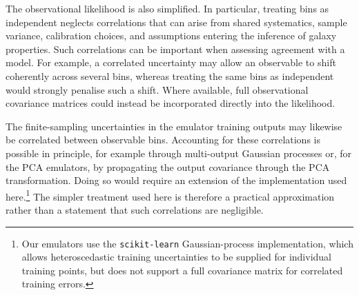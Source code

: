 \documentclass[twocolumn, apj, numberedappendix, iop]{openjournal}
\begin{document}
The observational likelihood is also simplified. In particular, treating bins
as independent neglects correlations that can arise from shared systematics,
sample variance, calibration choices, and assumptions entering the inference
of galaxy properties. Such correlations can be important when assessing
agreement with a model. For example, a correlated uncertainty may allow an
observable to shift coherently across several bins, whereas treating the same
bins as independent would strongly penalise such a shift. Where available, full observational covariance matrices could instead be incorporated directly into the likelihood.

The finite-sampling uncertainties in the emulator training outputs may likewise be correlated between observable bins. Accounting for these correlations is possible in principle, for example through multi-output Gaussian processes \citep{alvarez2012ftml-kernels} or, for the PCA emulators, by propagating the output covariance through the PCA transformation. Doing so would require an extension of the implementation used here.\footnote{Our emulators use the \texttt{scikit-learn} Gaussian-process implementation, which allows heteroscedastic training uncertainties to be supplied for individual training points, but does not support a full covariance matrix for correlated training errors.} The simpler treatment used here is therefore a practical approximation rather than a statement that such correlations are negligible.

\end{document}
